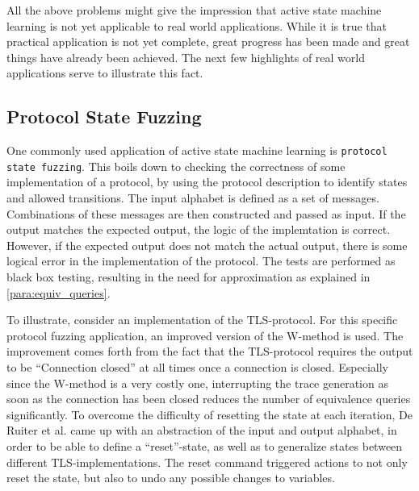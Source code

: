 \documentclass[multi,crop=false,class=article]{standalone}
\begin{document}

All the above problems might give the impression that active state machine
learning is not yet applicable to real world applications. While it is true that
practical application is not yet complete, great progress has been made and
great things have already been achieved. The next few highlights of real world
applications serve to illustrate this fact.


\subsection{Protocol State Fuzzing}
One commonly used application of active state machine learning is
\texttt{protocol state fuzzing}\cite{deRuiter15,Aarts13,Cho10,Aarts10}. This
boils down to checking the correctness of some implementation of a protocol, by
using the protocol description to identify states and allowed transitions. The
input alphabet is defined as a set of messages. Combinations of these messages
are then constructed and passed as input. If the output matches the expected
output, the logic of the implemtation is correct. However, if the expected
output does not match the actual output, there is some logical error in the
implementation of the protocol. The tests are performed as black box testing,
resulting in the need for approximation as explained in
\ref{para:equiv_queries}.

To illustrate, consider an implementation of the TLS-protocol\cite{deRuiter15}.
For this specific protocol fuzzing application, an improved version of the 
W-method\cite{Chow78} is used. The improvement comes forth from the fact that 
the TLS-protocol requires the output to be ``Connection closed'' at all times
once a connection is closed. Especially since the W-method is a very costly
one, interrupting the trace generation as soon as the connection has been
closed reduces the number of equivalence queries significantly. 
To overcome the difficulty of resetting the state at each iteration, De Ruiter
et al. came up with an abstraction of the input and output alphabet, in order 
to be able to define a ``reset''-state, as well as to generalize states between
different TLS-implementations. The reset command triggered actions to not only
reset the state, but also to undo any possible changes to variables.
\end{document}
